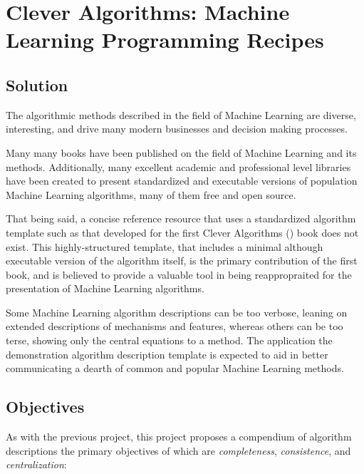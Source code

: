 \documentclass[a4paper, 11pt]{article}
\begin{document}
\section{Clever Algorithms: Machine Learning Programming Recipes}
\label{sec:project}

\subsection{Solution}
The algorithmic methods described in the field of Machine Learning are diverse, interesting, and drive many modern businesses and decision making processes. 

Many many books have been published on the field of Machine Learning and its methods. Additionally, many excellent academic and professional level libraries have been created to present standardized and executable versions of population Machine Learning algorithms, many of them free and open source. 

That being said, a concise reference resource that uses a standardized algorithm template such as that developed for the first Clever Algorithms (\cite{Brownlee2010a}) book does not exist. This highly-structured template, that includes a minimal although executable version of the algorithm itself, is the primary contribution of the first book, and is believed to provide a valuable tool in being reappropraited for the presentation of Machine Learning algorithms. 

Some Machine Learning algorithm descriptions can be too verbose, leaning on extended descriptions of mechanisms and features, whereas others can be too terse, showing only the central equations to a method. The application the demonstration algorithm description template is expected to aid in better communicating a dearth of common and popular Machine Learning methods.

\subsection{Objectives}
As with the previous project, this project proposes a compendium of algorithm descriptions the primary objectives of which are \emph{completeness}, \emph{consistence}, and \emph{centralization}:
\end{document}
